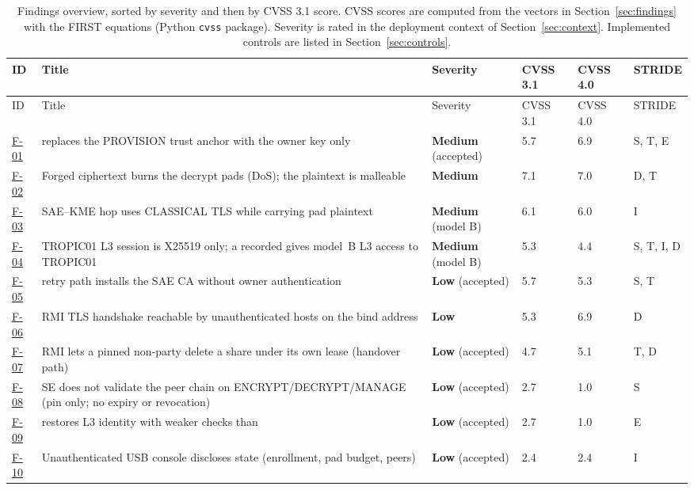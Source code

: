 \documentclass[11pt,a4paper]{article}
\newcommand{\sev}[1]{\textbf{#1}}
\begin{document}
\begin{longtable}{L{1.0cm}L{6.4cm}L{1.9cm}L{1.3cm}L{1.3cm}L{1.6cm}}
\caption{Findings overview, sorted by severity and then by CVSS 3.1 score. CVSS scores are computed from the vectors in Section~\ref{sec:findings} with the FIRST equations (Python \texttt{cvss} package). Severity is rated in the deployment context of Section~\ref{sec:context}. Implemented controls are listed in Section~\ref{sec:controls}.}\label{tab:summary}\\
\toprule ID & Title & Severity & CVSS 3.1 & CVSS 4.0 & STRIDE\\ \midrule\endfirsthead
\toprule ID & Title & Severity & CVSS 3.1 & CVSS 4.0 & STRIDE\\ \midrule\endhead
\hyperref[f:F-01]{F-01} &  replaces the PROVISION trust anchor with the owner key only & \sev{Medium} (accepted) & 5.7 & 6.9 & S, T, E\\
\hyperref[f:F-02]{F-02} & Forged ciphertext burns the decrypt pads (DoS); the plaintext is malleable & \sev{Medium} & 7.1 & 7.0 & D, T\\
\hyperref[f:F-03]{F-03} & SAE--KME hop uses CLASSICAL TLS while carrying pad plaintext & \sev{Medium} (model B) & 6.1 & 6.0 & I\\
\hyperref[f:F-04]{F-04} & TROPIC01 L3 session is X25519 only; a recorded  gives model~B L3 access to TROPIC01 & \sev{Medium} (model B) & 5.3 & 4.4 & S, T, I, D\\
\hyperref[f:F-05]{F-05} &  retry path installs the SAE CA without owner authentication & \sev{Low} (accepted) & 5.7 & 5.3 & S, T\\
\hyperref[f:F-06]{F-06} & RMI TLS handshake reachable by unauthenticated hosts on the bind address & \sev{Low} & 5.3 & 6.9 & D\\
\hyperref[f:F-07]{F-07} & RMI  lets a pinned non-party delete a share under its own lease (handover path) & \sev{Low} (accepted) & 4.7 & 5.1 & T, D\\
\hyperref[f:F-08]{F-08} & SE does not validate the peer chain on ENCRYPT/DECRYPT/MANAGE (pin only; no expiry or revocation) & \sev{Low} (accepted) & 2.7 & 1.0 & S\\
\hyperref[f:F-09]{F-09} &  restores L3 identity with weaker checks than  & \sev{Low} (accepted) & 2.7 & 1.0 & E\\
\hyperref[f:F-10]{F-10} & Unauthenticated USB console discloses state (enrollment, pad budget, peers) & \sev{Low} (accepted) & 2.4 & 2.4 & I\\

\end{longtable}
\end{document}
